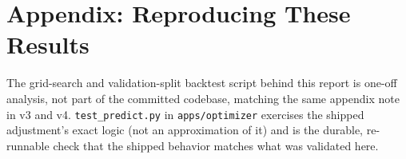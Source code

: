 \documentclass[11pt]{article}
\newcommand{\code}[1]{\allowbreak\texttt{\small #1}\allowbreak}
\begin{document}
\section*{Appendix: Reproducing These Results}

The grid-search and validation-split backtest script behind this report is one-off analysis, not part of the
committed codebase, matching the same appendix note in v3 and v4. \code{test\_predict.py} in
\code{apps/optimizer} exercises the shipped adjustment's exact logic (not an approximation of it) and is the
durable, re-runnable check that the shipped behavior matches what was validated here.
\end{document}
